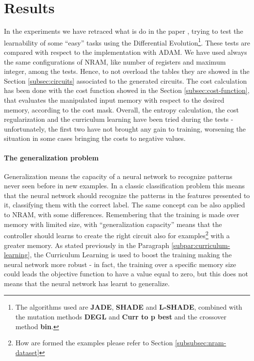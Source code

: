 \section{Results}
In the experiments we have retraced what is do in the paper \cite{NRAM:2016}, trying to test the learnability of some ``easy'' tasks using the Differential Evolution\footnote{The algorithms used are \textbf{JADE}, \textbf{SHADE} and \textbf{L-SHADE}, combined with the mutation methods \textbf{DEGL} and \textbf{Curr to p best} and the crossover method \textbf{bin}.}. These tests are compared with respect to the implementation with ADAM. We have used always the same configurations of NRAM, like number of registers and maximum integer, among the tests. Hence, to not overload the tables they are showed in the Section \ref{subsec:circuits} associated to the generated circuits. The cost calculation has been done with the cost function showed in the Section \ref{subsec:cost-function}, that evaluates the manipulated input memory with respect to the desired memory, according to the cost mask. Overall, the entropy calculation, the cost regularization and the curriculum learning have been tried during the tests - unfortunately, the first two have not brought any gain to training, worsening the situation in some cases bringing the costs to negative values.

\paragraph{The generalization problem}
Generalization means the capacity of a neural network to recognize patterns never seen before in new examples. In a classic classification problem this means that the neural network should recognize the patterns in the features presented to it, classifying them with the correct label. The same concept can be also applied to NRAM, with some differences. Remembering that the training is made over memory with limited size, with ``generalization capacity'' means that the controller should learns to create the right circuit also for examples\footnote{How are formed the examples please refer to Section \ref{subsubsec:nram-dataset}} with a greater memory. As stated previously in the Paragraph \ref{subpar:curriculum-learning}, the Curriculum Learning is used to boost the training making the neural network more robust - in fact, the training over a specific memory size could leads the objective function to have a value equal to zero, but this does not means that the neural network has learnt to generalize.


